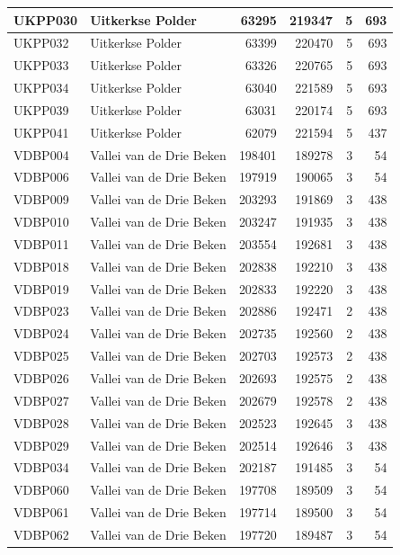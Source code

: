\documentclass[11pt,]{book}
\begin{document}
\begin{table}
\begin{tabular}[t]{l|l|r|r|r|r}
UKPP030 & Uitkerkse Polder & 63295 & 219347 & 5 & 693\\
\hline
UKPP032 & Uitkerkse Polder & 63399 & 220470 & 5 & 693\\
\hline
UKPP033 & Uitkerkse Polder & 63326 & 220765 & 5 & 693\\
\hline
UKPP034 & Uitkerkse Polder & 63040 & 221589 & 5 & 693\\
\hline
UKPP039 & Uitkerkse Polder & 63031 & 220174 & 5 & 693\\
\hline
UKPP041 & Uitkerkse Polder & 62079 & 221594 & 5 & 437\\
\hline
VDBP004 & Vallei van de Drie Beken & 198401 & 189278 & 3 & 54\\
\hline
VDBP006 & Vallei van de Drie Beken & 197919 & 190065 & 3 & 54\\
\hline
VDBP009 & Vallei van de Drie Beken & 203293 & 191869 & 3 & 438\\
\hline
VDBP010 & Vallei van de Drie Beken & 203247 & 191935 & 3 & 438\\
\hline
VDBP011 & Vallei van de Drie Beken & 203554 & 192681 & 3 & 438\\
\hline
VDBP018 & Vallei van de Drie Beken & 202838 & 192210 & 3 & 438\\
\hline
VDBP019 & Vallei van de Drie Beken & 202833 & 192220 & 3 & 438\\
\hline
VDBP023 & Vallei van de Drie Beken & 202886 & 192471 & 2 & 438\\
\hline
VDBP024 & Vallei van de Drie Beken & 202735 & 192560 & 2 & 438\\
\hline
VDBP025 & Vallei van de Drie Beken & 202703 & 192573 & 2 & 438\\
\hline
VDBP026 & Vallei van de Drie Beken & 202693 & 192575 & 2 & 438\\
\hline
VDBP027 & Vallei van de Drie Beken & 202679 & 192578 & 2 & 438\\
\hline
VDBP028 & Vallei van de Drie Beken & 202523 & 192645 & 3 & 438\\
\hline
VDBP029 & Vallei van de Drie Beken & 202514 & 192646 & 3 & 438\\
\hline
VDBP034 & Vallei van de Drie Beken & 202187 & 191485 & 3 & 54\\
\hline
VDBP060 & Vallei van de Drie Beken & 197708 & 189509 & 3 & 54\\
\hline
VDBP061 & Vallei van de Drie Beken & 197714 & 189500 & 3 & 54\\
\hline
VDBP062 & Vallei van de Drie Beken & 197720 & 189487 & 3 & 54\\

\end{tabular}
\end{table}
\end{document}
